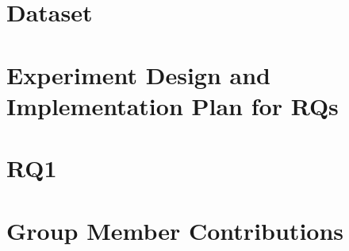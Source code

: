 \documentclass[10pt,journal,compsoc]{IEEEtran}
\begin{document}
\section{Dataset}\label{sec:data}


\section{Experiment Design and Implementation Plan for RQs}\label{sec:experiment}


\section{RQ1}

\label{sec:RQ1}


\section{Group Member Contributions} \label{sec:group}







\end{document}
